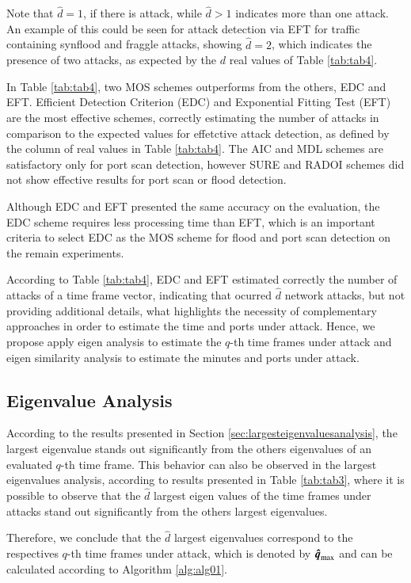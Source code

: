 \documentclass[review]{elsarticle}
\begin{document}
Note that $\hat{d} = 1$, if there is attack, while $\hat{d} > 1$ indicates more than one attack. An example of this could be seen for attack detection via EFT for traffic containing synflood and fraggle attacks, showing $\hat{d} = 2$, which indicates the presence of two attacks, as expected by the $d$ real values of Table \ref{tab:tab4}. 

In Table \ref{tab:tab4}, two MOS schemes outperforms from the others, EDC and EFT. Efficient Detection Criterion (EDC) and Exponential Fitting Test (EFT) are the most effective schemes, correctly estimating the number of attacks in comparison to the expected values for effetctive attack detection, as defined by the column of real values in Table \ref{tab:tab4}. The AIC and MDL schemes are satisfactory only for port scan detection, however SURE and RADOI schemes did not show effective results for port scan or flood detection.

Although EDC and EFT presented the same accuracy on the evaluation, the EDC scheme requires less processing time than EFT, which is an important criteria to select EDC as the MOS scheme for flood and port scan detection on the remain experiments.

According to Table \ref{tab:tab4}, EDC and EFT estimated correctly the number of attacks of a time frame vector, indicating that ocurred $\hat{d}$ network attacks, but not providing additional details, what highlights the necessity of complementary approaches in order to estimate the time and ports under attack. Hence, we propose apply eigen analysis to estimate the $q$-th time frames under attack and eigen similarity analysis to estimate the minutes and ports under attack.

\subsection{Eigenvalue Analysis}
\label{sec:EigenvalueAnalysis}

According to the results presented in Section \ref{sec:largesteigenvaluesanalysis}, the largest eigenvalue stands out significantly from the others eigenvalues of an evaluated $q$-th time frame. This behavior can also be observed in the largest eigenvalues analysis, according to results presented in Table \ref{tab:tab3}, where it is possible to observe that the $\hat{d}$ largest eigen values of the time frames under attacks stand out significantly from the others largest eigenvalues. 

Therefore, we conclude that the $\hat{d}$ largest eigenvalues correspond to the respectives $q$-th time frames under attack, which is denoted by $\rm{\boldsymbol{\hat{q}}}_{\rm max}$ and can be calculated according to Algorithm \ref{alg:alg01}.
\end{document}
